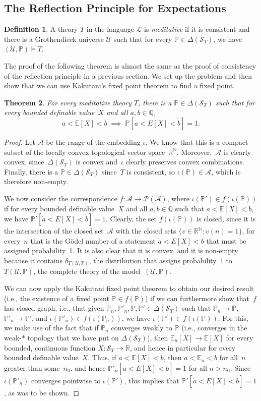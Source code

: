 \documentclass[12pt]{article}
\newcommand{\of}[1]{\left(#1\right)}
\newcommand{\Pow}[1]{\mathcal{P}\of{#1}}
\newcommand{\PP}{\mathbb{P}}
\newcommand{\EE}{\mathbb{E}}
\newcommand{\RR}{\mathbb{R}}
\newcommand{\NN}{\mathbb{N}}
\newcommand{\QQ}{\mathbb{Q}}
\newcommand{\cA}{\mathcal{A}}
\newcommand{\cL}{\mathcal{L}}
\newcommand{\cS}{\mathcal{S}}
\newcommand{\cU}{\mathcal{U}}
\theoremstyle{plain}
\newtheorem{theorem}{Theorem}[subsection]
\theoremstyle{definition}
\newtheorem{definition}[theorem]{Definition}
\theoremstyle{remark}
\begin{document}
\subsection{The Reflection Principle for Expectations}
\begin{definition}
A theory $T$ in the language $\cL$ is \emph{meditative} if it is consistent and there is a Grothendieck universe $\cU$ such that for every $\PP\in\Delta(\cS_T)$, we have $(\cU,\PP)\vDash T$.
\end{definition}
The proof of the following theorem is almost the same as the proof of consistency of the reflection principle in a previous section. We set up the problem and then show that we can use Kakutani's fixed point theorem to find a fixed point.
\begin{theorem}
For every meditative theory $T$, there is a $\PP\in\Delta(\cS_T)$ such that for every bounded definable value~$X$ and all $a,b\in\QQ$,
\[a<\EE[X]<b\;\implies\;\PP[\dot a < E[X] < \dot b] = 1.\]
\end{theorem}
\begin{proof}
Let $\cA$ be the range of the embedding $\iota$. We know that this is a compact subset of the locally convex topological vector space~$\RR^\NN$. Moreover,~$\cA$ is clearly convex, since~$\Delta(\cS_T)$ is convex and~$\iota$ clearly preserves convex combinations. Finally, there is a $\PP\in\Delta(\cS_T)$ since~$T$ is consistent, so $\iota(\PP)\in\cA$, which is therefore non-empty.

We now consider the correspondence $f : \cA\to\Pow{\cA}$, where $\iota(\PP')\in f(\iota(\PP))$ if for every bounded definable value~$X$ and all $a,b\in\QQ$ such that $a<\EE[X]<b$, we have $\PP'[\dot a < E[X] < \dot b] = 1$. Clearly, the set $f(\iota(\PP))$ is closed, since it is the intersection of the closed set~$\cA$ with the closed sets $\{v\in\RR^\NN : v(n) = 1\}$, for every~$n$ that is the G\"odel number of a statement $\dot a < E[X] < \dot b$ that must be assigned probability~1. It is also clear that it is convex, and it is non-empty because it contains $\delta_{T(\cU,\PP)}$, the distribution that assigns probability~1 to~$T(\cU,\PP)$, the complete theory of the model~$(\cU,\PP)$.

We can now apply the Kakutani fixed point theorem to obtain our desired result (i.e., the existence of a fixed point $\PP\in f(\PP)$) if we can furthermore show that~$f$ has closed graph, i.e., that given $\PP_n,\PP'_n,\PP,\PP'\in\Delta(\cS_T)$ such that $\PP_n\to\PP$, $\PP'_n\to\PP'$, and $\iota(\PP'_n)\in f(\iota(\PP_n))$, we have $\iota(\PP')\in f(\iota(\PP))$. For this, we make use of the fact that if $\PP_n$ converges weakly to $\PP$ (i.e., converges in the weak-$*$ topology that we have put on $\Delta(\cS_T)$), then $\EE_n[X]\to\EE[X]$ for every bounded, continuous function $X : \cS_T\to\RR$, and hence in particular for every bounded definable value~$X$. Thus, if $a < \EE[X] < b$, then $a < \EE_n < b$ for all~$n$ greater than some~$n_0$, and hence $\PP'_n[\dot a < E[X] < \dot b] = 1$ for all $n>n_0$. Since $\iota(\PP'_n)$ converges pointwise to $\iota(\PP')$, this implies that $\PP'[\dot a < E[X] < \dot b] = 1$, as was to be shown.
\end{proof}
\end{document}
